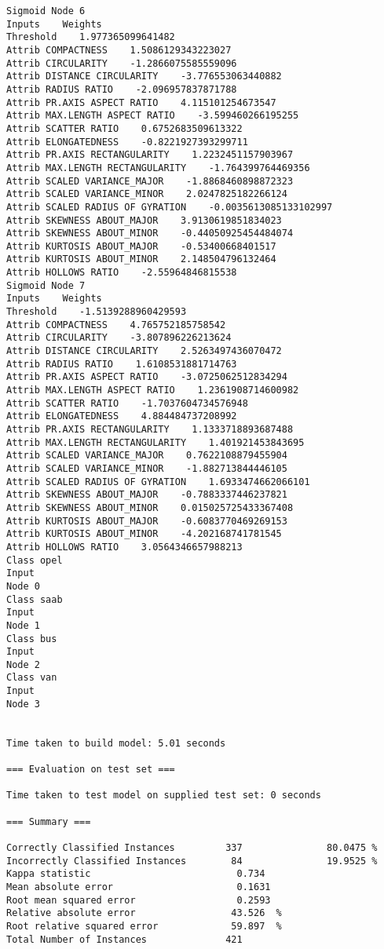 \documentclass[
	article,			%
	11pt,				%
	oneside,			%
	a4paper,			%
	english,			%
	brazil,				%
	sumario=tradicional
	]{abntex2}
\begin{document}
\begin{lstlisting}
Sigmoid Node 6
Inputs    Weights
Threshold    1.977365099641482
Attrib COMPACTNESS    1.5086129343223027
Attrib CIRCULARITY    -1.2866075585559096
Attrib DISTANCE CIRCULARITY    -3.776553063440882
Attrib RADIUS RATIO    -2.096957837871788
Attrib PR.AXIS ASPECT RATIO    4.115101254673547
Attrib MAX.LENGTH ASPECT RATIO    -3.599460266195255
Attrib SCATTER RATIO    0.6752683509613322
Attrib ELONGATEDNESS    -0.8221927393299711
Attrib PR.AXIS RECTANGULARITY    1.2232451157903967
Attrib MAX.LENGTH RECTANGULARITY    -1.764399764469356
Attrib SCALED VARIANCE_MAJOR    -1.8868460898872323
Attrib SCALED VARIANCE_MINOR    2.0247825182266124
Attrib SCALED RADIUS OF GYRATION    -0.0035613085133102997
Attrib SKEWNESS ABOUT_MAJOR    3.9130619851834023
Attrib SKEWNESS ABOUT_MINOR    -0.44050925454484074
Attrib KURTOSIS ABOUT_MAJOR    -0.53400668401517
Attrib KURTOSIS ABOUT_MINOR    2.148504796132464
Attrib HOLLOWS RATIO    -2.55964846815538
Sigmoid Node 7
Inputs    Weights
Threshold    -1.5139288960429593
Attrib COMPACTNESS    4.765752185758542
Attrib CIRCULARITY    -3.807896226213624
Attrib DISTANCE CIRCULARITY    2.5263497436070472
Attrib RADIUS RATIO    1.6108531881714763
Attrib PR.AXIS ASPECT RATIO    -3.0725062512834294
Attrib MAX.LENGTH ASPECT RATIO    1.2361908714600982
Attrib SCATTER RATIO    -1.7037604734576948
Attrib ELONGATEDNESS    4.884484737208992
Attrib PR.AXIS RECTANGULARITY    1.1333718893687488
Attrib MAX.LENGTH RECTANGULARITY    1.401921453843695
Attrib SCALED VARIANCE_MAJOR    0.7622108879455904
Attrib SCALED VARIANCE_MINOR    -1.882713844446105
Attrib SCALED RADIUS OF GYRATION    1.6933474662066101
Attrib SKEWNESS ABOUT_MAJOR    -0.7883337446237821
Attrib SKEWNESS ABOUT_MINOR    0.015025725433367408
Attrib KURTOSIS ABOUT_MAJOR    -0.6083770469269153
Attrib KURTOSIS ABOUT_MINOR    -4.202168741781545
Attrib HOLLOWS RATIO    3.0564346657988213
Class opel
Input
Node 0
Class saab
Input
Node 1
Class bus
Input
Node 2
Class van
Input
Node 3


Time taken to build model: 5.01 seconds

=== Evaluation on test set ===

Time taken to test model on supplied test set: 0 seconds

=== Summary ===

Correctly Classified Instances         337               80.0475 %
Incorrectly Classified Instances        84               19.9525 %
Kappa statistic                          0.734 
Mean absolute error                      0.1631
Root mean squared error                  0.2593
Relative absolute error                 43.526  %
Root relative squared error             59.897  %
Total Number of Instances              421     


\end{lstlisting}
\end{document}
